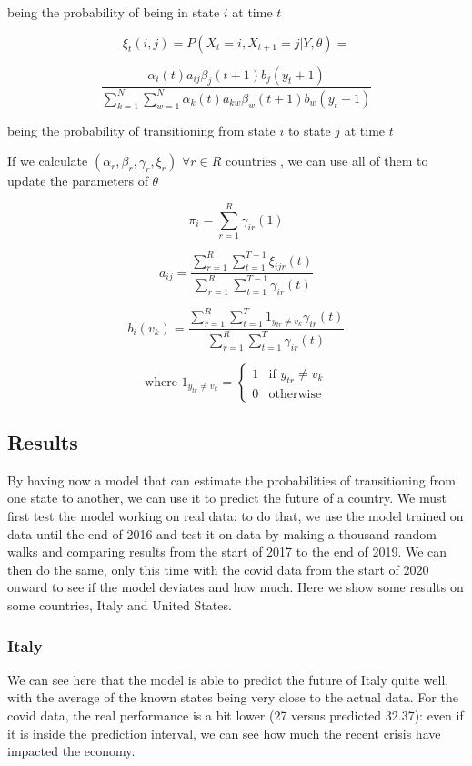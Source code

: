 being the probability of being in state $i$ at time $t$

\[\xi_t(i, j) = P(X_t = i, X_{t+1} = j | Y, \theta) =\]

\[\frac{\alpha_i(t) a_{ij} \beta_j(t+1) b_j(y_t+1)}{\sum_{k=1}^{N}\sum_{w=1}^{N}\alpha_k(t) a_{kw} \beta_w(t+1) b_w(y_t+1)}\]

being the probability of transitioning from state $i$ to state $j$ at time $t$

If we calculate $(\alpha_r, \beta_r, \gamma_r, \xi_r)$ $\forall r \in R \text{ countries }$, we can use all of them to update the parameters of $\theta$

\[\pi_i = \sum_{r=1}^{R} \gamma_{ir}(1)\]

\[a_{ij} = \frac{\sum_{r=1}^{R} \sum_{t=1}^{T-1} \xi_{ijr}(t)}{\sum_{r=1}^{R} \sum_{t=1}^{T-1} \gamma_{ir}(t)}\]

\[b_i(v_k) = \frac{\sum_{r=1}^{R} \sum_{t=1}^{T} 1_{y_{tr} \ne v_k} \gamma_{ir}(t)}{\sum_{r=1}^{R} \sum_{t=1}^{T} \gamma_{ir}(t)}\]

\[\text{where } 1_{y_{tr} \ne v_k} = \begin{cases} 1 & \text{if $y_{tr} \ne v_k$} \\ 0 & \text{otherwise} \end{cases}\]

\subsection*{Results}

By having now a model that can estimate the probabilities of transitioning from one state to another, we can use it to predict the future of a country. We must first test the model working on real data: to do that, we use the model trained on data until the end of 2016 and test it on data by making a thousand random walks and comparing results from the start of 2017 to the end of 2019. We can then do the same, only this time with the covid data from the start of 2020 onward to see if the model deviates and how much. Here we show some results on some countries, Italy and United States.


\subsubsection*{Italy}

We can see here that the model is able to predict the future of Italy quite well, with the average of the known states being very close to the actual data. For the covid data, the real performance is a bit lower (27 versus predicted 32.37): even if it is inside the prediction interval, we can see how much the recent crisis have impacted the economy.

